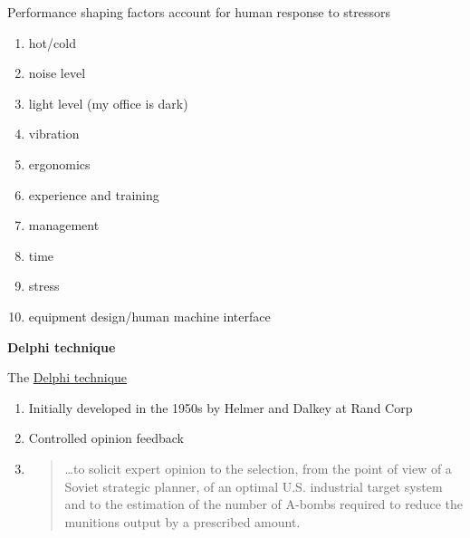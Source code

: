 \documentclass[aspectratio=1610,pdftex,dvipsnames,compress,xcolor={dvipsnames}]{beamer}
\begin{document}
\begin{frame}{Performance shaping factors account for human response to stressors}
    \begin{enumerate}[series=outerlist,topsep=0pt,itemsep=3pt,leftmargin=*,label=(\arabic*)]
        \item[]hot/cold  
        \item[]noise level   
        \item[]light level (my office is dark)  
        \item[]vibration  
        \item[]ergonomics
        \item[]experience and training
        \item[]management
        \item[]time
        \item[]stress
        \item[]equipment design/human machine interface
    \end{enumerate}
\end{frame}


\begin{frame}[plain]{}
    \centering\LARGE\textbf{Delphi technique}
\end{frame}


\addtocounter{framenumber}{-1}
\begin{frame}{The \href{https://uidaho.pressbooks.pub/riskassessment/chapter/failure-rates/}{Delphi technique}}
    \begin{enumerate}[series=outerlist,topsep=0pt,itemsep=21pt,leftmargin=*,label=(\arabic*)]
        \item[]Initially developed in the 1950s by Helmer and Dalkey at Rand Corp
        \item[]Controlled opinion feedback
        \item[]
            \begin{quote}
                \ldots to solicit expert opinion to the selection, from the point of view of a Soviet strategic planner, of an optimal U.S. industrial target system and to the estimation of the number of A-bombs required to reduce the munitions output by a prescribed amount.
            \end{quote}
    \end{enumerate}
\end{frame}
\end{document}

